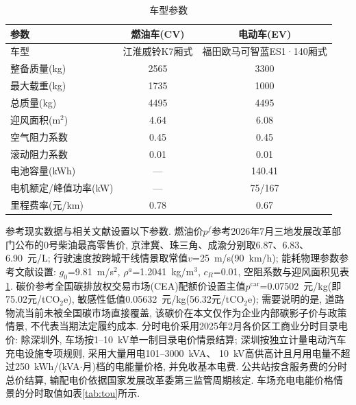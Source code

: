 \documentclass{setp-new}
\newcommand{\setptabsetup}{\fontsize{9pt}{10.5pt}\selectfont\renewcommand{\arraystretch}{0.95}\setlength{\tabcolsep}{2.2pt}\setlength{\aboverulesep}{0.4pt}\setlength{\belowrulesep}{0.4pt}\hbadness=10000}
\begin{document}
\begin{table}[H]
\centering
\caption{车型参数}
\label{tab:vehicle}
\setptabsetup
\begin{tabular*}{\linewidth}{@{\extracolsep{\fill}}lcc@{}}
\toprule
参数 & 燃油车(CV) & 电动车(EV)\\
\midrule
车型             & 江淮威铃K7厢式 & 福田欧马可智蓝ES1·140厢式\\
整备质量(kg)     & 2565 & 3300\\
最大载重(kg)     & 1735 & 1000\\
总质量(kg)       & 4495 & 4495\\
迎风面积(m$^2$)  & 4.64 & 6.08\\
空气阻力系数     & 0.45 & 0.45\\
滚动阻力系数     & 0.01 & 0.01\\
电池容量(kWh)    & --- & 140.41\\
电机额定/峰值功率(kW) & --- & 75/167\\
里程费率(元/km)  & 0.78 & 0.67\\
\bottomrule
\end{tabular*}
\end{table}

参考现实数据与相关文献设置以下参数.
燃油价$p^f$参考2026年7月三地发展改革部门公布的0号柴油最高零售价,
京津冀、珠三角、成渝分别取6.87、6.83、6.90~元/L;
行驶速度按跨城干线情景取常值$v$=25~m/s(90~km/h);
能耗物理参数参考文献\cite{ref:27,ref:36}设置:
$g_0$=9.81~m/s$^2$, $\rho^a$=1.2041~kg/m$^3$, $c_R$=0.01, 空阻系数与迎风面积见表\ref{tab:vehicle}.
碳价参考全国碳排放权交易市场(CEA)配额价\cite{ref:87}设置主值$p^{\mathrm{car}}$=0.07502~元/kg(即75.02元/tCO$_2$e),
敏感性低值0.05632~元/kg(56.32元/tCO$_2$e);
需要说明的是, 道路物流当前未被全国碳市场直接覆盖, 该碳价在本文仅作为企业内部碳影子价与政策情景, 不代表当期法定履约成本.
分时电价采用2025年2月各价区工商业分时目录电价:
除深圳外, 车场按1--10~kV单一制目录电价情景结算;
深圳按独立计量电动汽车充电设施专项规则, 采用大量用电101--3000~kVA、
10~kV高供高计且月用电量不超过250~kWh/(kVA$\cdot$月)档的电能量价格,
并免收基本电费\cite{ref:88}.
公共站按含服务费的分时总价结算, 输配电价依据国家发展改革委第三监管周期核定\cite{ref:83}.
车场充电电能价格情景的分时取值如表\ref{tab:tou}所示.
\end{document}
